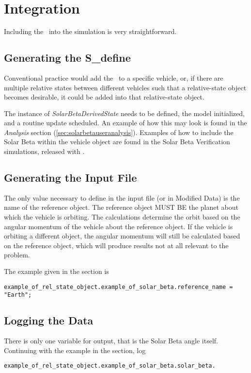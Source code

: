 %
%
% 
%

 \section{Integration}
Including the \SolarBetaDesc\  into the simulation is very straightforward.

 \subsection{Generating the S\_define}

Conventional practice would add the \SolarBetaDesc\ to a specific vehicle, or, if there are multiple relative states between different vehicles such that a relative-state object becomes desirable, it could be added into that relative-state object.

The instance of \textit{SolarBetaDerivedState} needs to be defined, the model initialized, and a routine update scheduled.  An example of how this may look is found in the \textit{Analysis} section (\ref{sec:solarbetauseranalysis}).  Examples of how to include the Solar Beta within the vehicle object are found in the Solar Beta Verification simulations, released with \JEODid.

\subsection{Generating the Input File}
The only value necessary to define in the input file (or in Modified Data) is the name of the reference object.  The reference object MUST BE the planet about which the vehicle is orbiting. The calculations determine the orbit based on the angular momentum of the vehicle about the reference object.  If the vehicle is orbiting a different object, the angular momentum will still be calculated based on the reference object, which will produce results not at all relevant to the problem.

The example given in the  section is
\begin{verbatim}
example_of_rel_state_object.example_of_solar_beta.reference_name = "Earth";
\end{verbatim}

\subsection{Logging the Data}
There is only one variable for output, that is the Solar Beta angle itself.  Continuing with the example in the  section, log
\begin{verbatim}
example_of_rel_state_object.example_of_solar_beta.solar_beta.
\end{verbatim}
